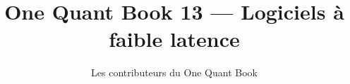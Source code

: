 \documentclass[11pt,a4paper,twoside,openany]{book}
\title{One Quant Book 13 --- Logiciels à faible latence}
\author{Les contributeurs du One Quant Book}
\date{\bookdate}
\begin{document}
\frontmatter



\tableofcontents

\mainmatter


\appendix
\part{\omsolutionspart}


\backmatter
\printindex
\end{document}
